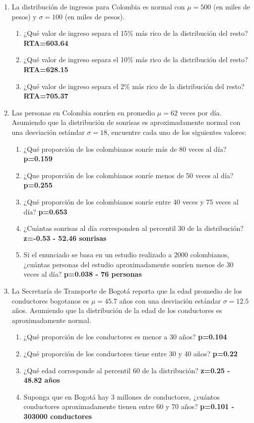 \documentclass[letterpaper]{article}
\begin{document}
\begin{enumerate}
	\item La distribución de ingresos para Colombia es normal con $\mu=500$ (en miles de pesos) y $\sigma=100$ (en miles de pesos).
	\begin{enumerate}
		\item ¿Qué valor de ingreso separa el 15\% más rico de la distribución del resto? {\bf RTA=603.64}
		\item ¿Qué valor de ingreso separa el 10\% más rico de la distribución del resto? {\bf RTA=628.15}
		\item ¿Qué valor de ingreso separa el 2\% más rico de la distribución del resto? {\bf RTA=705.37}
	\end{enumerate}

\item Las personas en Colombia sonríen en promedio $\mu=62$ veces por día. Asumiendo que la distribución de sonrisas es aproximadamente normal con una desviación estándar $\sigma=18$, encuentre cada uno de los siguientes valores:
\begin{enumerate}
	\item ¿Qué proporción de los colombianos sonríe más de 80 veces al día? {\bf p=0.159}
	\item ¿Que proporción de los colombianos sonríe menos de 50 veces al día? {\bf p=0.255}
	\item ¿Qué proporción de los colombianos sonríe entre 40 veces y 75 veces al día? {\bf p=0.653}
	\item ¿Cuántas sonrisas al día corresponden al percentil 30 de la distribución? {\bf z=-0.53 - 52.46 sonrisas}
	\item Si el enunciado se basa en un estudio realizado a 2000 colombianos, ¿cuántas personas del estudio aproximadamente sonríen menos de 30 veces al día? {\bf p=0.038 - 76 personas}
\end{enumerate}
\item La Secretaría de Transporte de Bogotá reporta que la edad promedio de los conductores bogotanos es $\mu=45.7$ años con una desviación estándar $\sigma=12.5$ años. Asumiendo que la distribución de la edad de los conductores es aproximadamente normal.
\begin{enumerate}
	\item ¿Qué proporción de los conductores es menor a 30 años? {\bf p=0.104}
	\item ¿Qué proporción de los conductores tiene entre 30 y 40 años? {\bf p=0.22}
	\item ¿Qué edad corresponde al percentil 60 de la distribución? {\bf z=0.25 - 48.82 años}
	\item Suponga que en Bogotá hay 3 millones de conductores, ¿cuántos conductores aproximadamente tienen entre 60 y 70 años? {\bf p=0.101 - 303000 conductores}
\end{enumerate}


\end{enumerate}
\end{document}
